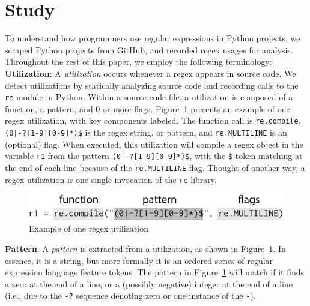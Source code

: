 \section{Study}
\label{sec:study}

To understand how programmers use regular expressions in Python projects, we scraped  Python projects from GitHub, and recorded regex usages for analysis. Throughout the rest of this paper, we  employ the following terminology:\\

\noindent \textbf{Utilization}: A \emph{utilization} occurs whenever a regex appears in source code.  We detect utilizations by statically analyzing source code and recording calls to the {\tt re} module in Python.
Within a source code file, a {utilization} is composed of a function, a pattern, and 0 or more flags.  Figure~\ref{fig:exampleUsage} presents an example of one regex utilization, with key components labeled. The function call is {\tt re.compile}, \verb!(0|-?[1-9][0-9]*)$! is the regex string, or pattern, and {\tt re.MULTILINE} is an (optional) flag. When executed, this {utilization}  will compile a regex object in the variable {\tt r1} from the pattern \verb!(0|-?[1-9][0-9]*)$!, with the \verb!$! token matching at the end of each line because of the {\tt re.MULTILINE} flag. Thought of another way, a regex utilization is one single invocation of the {\tt re} library.\\

\begin{figure}[tb]
\centering
\includegraphics[width=\columnwidth]{nontex/exampleUsage.eps}
\vspace{-12pt}
\caption{Example of one regex utilization}
\vspace{-6pt}
\label{fig:exampleUsage}
\end{figure}

\noindent \textbf{Pattern}: A \emph{pattern} is extracted from a utilization, as shown in Figure~\ref{fig:exampleUsage}. In essence, it is a string, but more formally it is an ordered series of regular expression language feature tokens.  The pattern in Figure~\ref{fig:exampleUsage}  will match if it finds a zero at the end of a line, or a (possibly negative) integer at the end of a line (i.e., due to the {\tt -?} sequence denoting zero or one instance of the {\tt -}).

